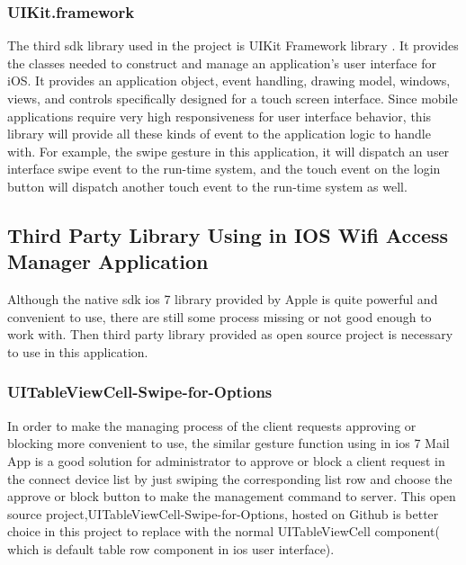 \subsubsection{UIKit.framework}
\par The third \gls{sdk} library used in the project is UIKit Framework library \cite{uikitlib}. It provides the classes needed to construct and manage an application’s user interface for iOS. It provides an application object, event handling, drawing model, windows, views, and controls specifically designed for a touch screen interface. Since mobile applications require very high responsiveness for user interface behavior, this library will provide all these kinds of event to the application logic to handle with. For example, the swipe gesture in this application, it will dispatch an user interface swipe event to the run-time system, and the touch event on the login button will dispatch another touch event to the run-time system as well.

\subsection{Third Party Library Using in IOS Wifi Access Manager Application}

\par Although the native \gls{sdk} \gls{ios} 7 library provided by Apple is quite powerful and convenient to use, there are still some process missing or not good enough to work with. Then third party library provided as open source project is necessary to use in this application.

\subsubsection{UITableViewCell-Swipe-for-Options}
\par In order to make the managing process of the client requests approving or blocking more convenient to use, the similar gesture function using in \gls{ios} 7 Mail App is a good solution for administrator to approve or block a client request in the connect device list by just swiping the corresponding list row and choose the approve or block button to make the management command to server. This open source project,UITableViewCell-Swipe-for-Options\cite{swipe-for-options}, hosted on Github is better choice in this project to replace with the normal UITableViewCell component( which is default table row component in \gls{ios} user interface).

